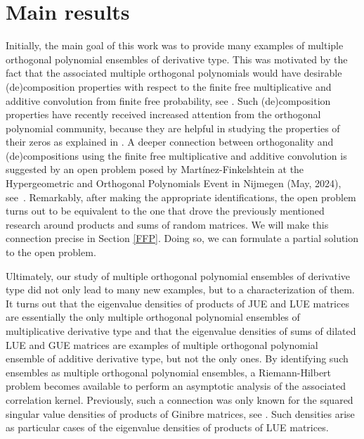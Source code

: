 \documentclass[a4paper,12pt,oneside]{article}
\theoremstyle{definition}
\begin{document}
\section{Main results}

Initially, the main goal of this work was to provide many examples of multiple orthogonal polynomial ensembles of derivative type. This was motivated by the fact that the associated multiple orthogonal polynomials would have desirable (de)composition properties with respect to the finite free multiplicative and additive convolution from finite free probability, see \cite{MSS:fin_free_conv}. Such (de)composition properties have recently received increased attention from the orthogonal polynomial community, because they are helpful in studying the properties of their zeros as explained in \cite{MFMP1,MFMP2}. A deeper connection between orthogonality and (de)compositions using the finite free multiplicative and additive convolution is suggested by an open problem posed by Martínez-Finkelshtein at the Hypergeometric and Orthogonal Polynomials Event in Nijmegen (May, 2024), see~\cite{HOPE}. Remarkably, after making the appropriate identifications, the open problem turns out to be equivalent to the one that drove the previously mentioned research around products and sums of random matrices. We will make this connection precise in Section \ref{FFP}. Doing so, we can formulate a partial solution to the open problem.
\medbreak

Ultimately, our study of multiple orthogonal polynomial ensembles of derivative type did not only lead to many new examples, but to a characterization of them. It turns out that the eigenvalue densities of products of JUE and LUE matrices are essentially the only multiple orthogonal polynomial ensembles of multiplicative derivative type and that the eigenvalue densities of sums of dilated LUE and GUE matrices are examples of multiple orthogonal polynomial ensemble of additive derivative type, but not the only ones. By identifying such ensembles as multiple orthogonal polynomial ensembles, a Riemann-Hilbert problem becomes available to perform an asymptotic analysis of the associated correlation kernel. Previously, such a connection was only known for the squared singular value densities of products of Ginibre matrices, see \cite{KZ:prod_gin}. Such densities arise as particular cases of the eigenvalue densities of products of LUE matrices.
\medbreak
\end{document}
